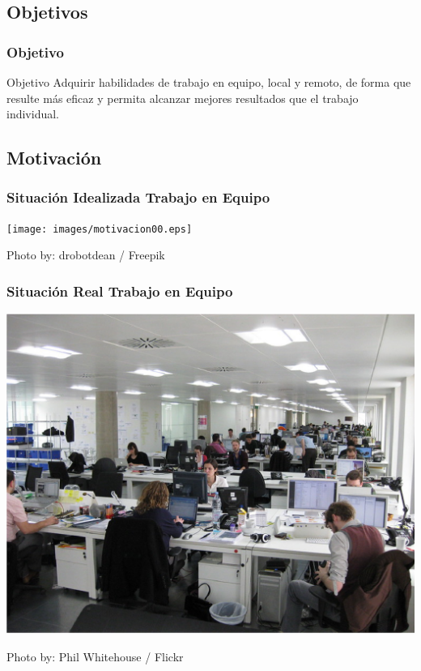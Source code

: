 \documentclass[a4paper,t,xcolor=pst,dvips]{beamer}
\begin{document}
\subsection{Objetivos}

\begin{frame}[c]
	\frametitle{Objetivo}
	\begin{block}{Objetivo}
		Adquirir habilidades de trabajo en equipo, local y remoto, de forma que resulte más eficaz y permita alcanzar mejores resultados que el trabajo individual.
	\end{block}
\end{frame}

\subsection{Motivación}

\begin{frame}[c]
	\frametitle{Situación Idealizada Trabajo en Equipo}
	\begin{center}
		\texttt{[image: images/motivacion00.eps]}
	\end{center}
	\begin{flushright}
		\tiny{Photo by: drobotdean / Freepik}
	\end{flushright}

\end{frame}

\begin{frame}[c]
	\frametitle{Situación Real Trabajo en Equipo}
	\begin{center}
		\includegraphics[width=0.73\linewidth,keepaspectratio=true]{images/motivacion01.eps}
	\end{center}
	\begin{flushright}
		\tiny{Photo by: Phil Whitehouse / Flickr}
	\end{flushright}
\end{frame}
\end{document}
